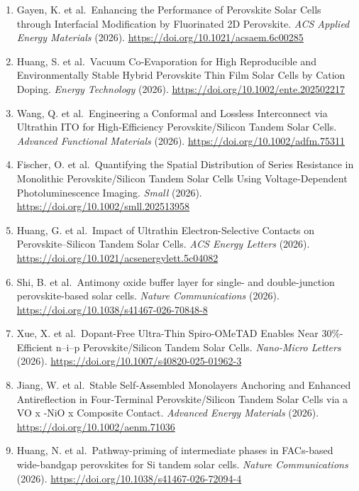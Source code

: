 \documentclass[
  11pt,
]{article}
\begin{document}
\begin{enumerate}
  Films via Two‐Step Blade‐Coating for Efficient and Stable Inverted
  Solar Cells. \emph{Solar RRL} (2026).
  \url{https://doi.org/10.1002/solr.70385}
\item
  Gayen, K. et al.~Enhancing the Performance of Perovskite Solar Cells
  through Interfacial Modification by Fluorinated 2D Perovskite.
  \emph{ACS Applied Energy Materials} (2026).
  \url{https://doi.org/10.1021/acsaem.6c00285}
\item
  Huang, S. et al.~Vacuum Co‐Evaporation for High Reproducible and
  Environmentally Stable Hybrid Perovskite Thin Film Solar Cells by
  Cation Doping. \emph{Energy Technology} (2026).
  \url{https://doi.org/10.1002/ente.202502217}
\item
  Wang, Q. et al.~Engineering a Conformal and Lossless Interconnect via
  Ultrathin ITO for High‐Efficiency Perovskite/Silicon Tandem Solar
  Cells. \emph{Advanced Functional Materials} (2026).
  \url{https://doi.org/10.1002/adfm.75311}
\item
  Fischer, O. et al.~Quantifying the Spatial Distribution of Series
  Resistance in Monolithic Perovskite/Silicon Tandem Solar Cells Using
  Voltage‐Dependent Photoluminescence Imaging. \emph{Small} (2026).
  \url{https://doi.org/10.1002/smll.202513958}
\item
  Huang, G. et al.~Impact of Ultrathin Electron-Selective Contacts on
  Perovskite--Silicon Tandem Solar Cells. \emph{ACS Energy Letters}
  (2026). \url{https://doi.org/10.1021/acsenergylett.5c04082}
\item
  Shi, B. et al.~Antimony oxide buffer layer for single- and
  double-junction perovskite-based solar cells. \emph{Nature
  Communications} (2026).
  \url{https://doi.org/10.1038/s41467-026-70848-8}
\item
  Xue, X. et al.~Dopant-Free Ultra-Thin Spiro-OMeTAD Enables Near
  30\%-Efficient n--i--p Perovskite/Silicon Tandem Solar Cells.
  \emph{Nano-Micro Letters} (2026).
  \url{https://doi.org/10.1007/s40820-025-01962-3}
\item
  Jiang, W. et al.~Stable Self‐Assembled Monolayers Anchoring and
  Enhanced Antireflection in Four‐Terminal Perovskite/Silicon Tandem
  Solar Cells via a VO x ‐NiO x Composite Contact. \emph{Advanced Energy
  Materials} (2026). \url{https://doi.org/10.1002/aenm.71036}
\item
  Huang, N. et al.~Pathway-priming of intermediate phases in FACs-based
  wide-bandgap perovskites for Si tandem solar cells. \emph{Nature
  Communications} (2026).
  \url{https://doi.org/10.1038/s41467-026-72094-4}

\end{enumerate}
\end{document}
